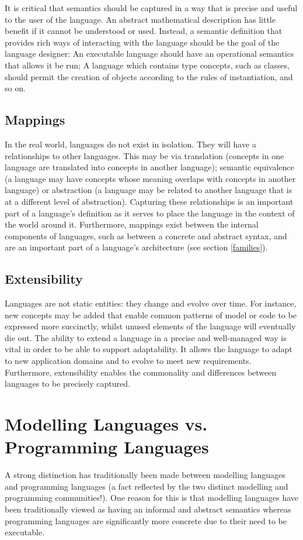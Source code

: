 It is critical that semantics should be captured in a way that is
precise and useful to the user of the language. An abstract
mathematical description has little benefit if it cannot be
understood or used. Instead, a semantic definition that provides
rich ways of interacting with the language should be the goal of
the language designer: An executable language should have an
operational semantics that allows it be run; A language which
contains type concepts, such as classes, should permit the
creation of objects according to the rules of instantiation, and
so on.

\subsection{Mappings} In the real world, languages
do not exist in isolation. They will have a relationships to other
languages. This may be via translation (concepts in one language
are translated into concepts in another language); semantic
equivalence (a language may have concepts whose meaning overlaps
with concepts in another language) or abstraction (a language may
be related to another language that is at a different level of
abstraction). Capturing these relationships is an important part
of a language's definition as it serves to place the language in
the context of the world around it. Furthermore, mappings exist
between the internal components of languages, such as between a
concrete and abstract syntax, and are an important part of a
language's architecture (see section \ref{families}).

\subsection{Extensibility} Languages are not static entities: they
change and evolve over time. For instance, new concepts may be
added that enable common patterns of model or code to be expressed
more succinctly, whilst unused elements of the language will
eventually die out. The ability to extend a language in a precise
and well-managed way is vital in order to be able to support
adaptability. It allows the language to adapt to new application
domains and to evolve to meet new requirements. Furthermore,
extensibility enables the commonality and differences between
languages to be precisely captured.

\section{Modelling Languages vs. Programming Languages}
\label{progvsmodel} A strong distinction has traditionally been
made between modelling languages and programming languages (a fact
reflected by the two distinct modelling and programming
communities!). One reason for this is that modelling languages
have been traditionally viewed as having an informal and abstract
semantics whereas programming languages are significantly more
concrete due to their need to be executable.

